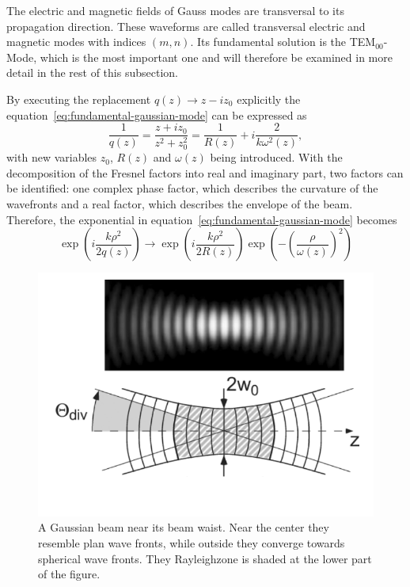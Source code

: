 The electric and magnetic fields of Gauss modes are transversal to its propagation direction.
These waveforms are called transversal electric and magnetic modes with indices $(m,n)$.
Its fundamental solution is the TEM$_{00}$-Mode, which is the most important one and will therefore be examined in more detail in the rest of this subsection.

By executing the replacement $q(z)\rightarrow z-iz_0$ explicitly the equation~\eqref{eq:fundamental-gaussian-mode} can be expressed as
\begin{equation}
\frac{1}{q(z)}=\frac{z+iz_0}{z^2+z_0^2}=\frac{1}{R(z)}+i\frac{2}{k\omega^2(z)},
\end{equation}
with new variables $z_0$, $R(z)$ and $\omega(z)$ being introduced.
With the decomposition of the Fresnel factors into real and imaginary part, two factors can be identified: one complex phase factor, which describes the curvature of the wavefronts and a real factor, which describes the envelope of the beam.
Therefore, the exponential in equation~\eqref{eq:fundamental-gaussian-mode} becomes
\begin{equation}
\exp\left(i\frac{k\rho^2}{2q(z)}\right) \rightarrow \exp\left(i\frac{k\rho^2}{2R(z)}\right)\exp\left(-\left(\frac{\rho}{\omega(z)}\right)^2\right)
\end{equation}
\begin{figure}[H]
	\centering
	\includegraphics[width=0.8\linewidth]{figures/fabry-perot/gaussian-mode-near-beam-waist}
	\caption[A Gaussian beam near its beam waist.]
	{A Gaussian beam near its beam waist.
		Near the center they resemble plan wave fronts, while outside they converge towards spherical wave fronts.
		They Rayleighzone is shaded at the lower part of the figure.\cite{meschede_optik_2008}}
	\label{fig:gaussian-mode-near-beam-waist}
\end{figure}
